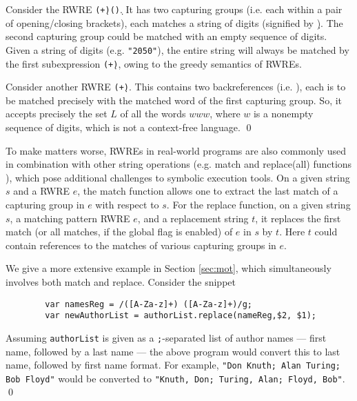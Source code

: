 \begin{example}
    Consider the RWRE \texttt{(\d+)(\d*)}. It has two capturing
    groups (i.e. each within a pair of opening/closing brackets), each matches
    a string of digits (signified by \texttt{\d}). The second 
    capturing group
    could be matched with an empty sequence of digits. Given a string of digits
    (e.g. \texttt{"2050"}), the entire string will always be matched by the
    first subexpression \texttt{(\d+)}, owing to the greedy semantics of
    RWREs. 

    Consider another RWRE \texttt{(\d+)\1\1}. This contains two
    backreferences (i.e. \texttt{\1}), each is to be 
    matched precisely with
    the matched word of the first capturing group. So, it
    accepts precisely the set $L$ of all the words $www$, where $w$ is a 
    nonempty sequence of digits, which is not a context-free language.
    \qed
\end{example}


To make matters worse,
RWREs in real-world programs are also commonly used in combination with
other string operations (e.g. match and replace(all) functions \cite{LMK19}),
which pose additional challenges to symbolic execution tools.
On a given string $s$ and a RWRE $e$, the match function allows one to extract 
the last match of a capturing group in $e$ with respect to $s$. 
For the replace function, on a given string $s$, a matching pattern RWRE $e$, and a replacement string $t$, it replaces the first match (or all 
matches, if the global flag is enabled) of $e$ in $s$ by $t$. Here $t$
could contain references to the matches of various capturing groups
in $e$. 
\begin{example}\label{exmp-name-swap}
    We give a more extensive example in Section \ref{sec:mot}, which 
    simultaneously involves both match and replace. Consider the snippet
    \begin{verbatim}
        var namesReg = /([A-Za-z]+) ([A-Za-z]+)/g;
        var newAuthorList = authorList.replace(nameReg,$2, $1);
    \end{verbatim}
    Assuming \texttt{authorList} is given as a \texttt{;}-separated 
    list of author names --- first name, followed by a last name ---
    the above program would convert this to last name, followed by first name
    format. For example, \texttt{"Don Knuth; Alan Turing; Bob Floyd"} would
    be converted to \texttt{"Knuth, Don; Turing, Alan; Floyd, Bob"}.
    \qed
\end{example}

